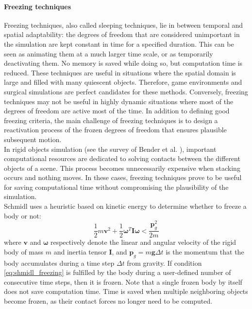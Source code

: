 \paragraph*{Freezing techniques}
Freezing techniques, also called sleeping techniques, lie in between temporal and spatial adaptability: the degrees of freedom that are considered unimportant in the simulation are kept constant in time for a specified duration.
This can be seen as animating them at a much larger time scale, or as temporarily deactivating them.
No memory is saved while doing so, but computation time is reduced.
These techniques are useful in situations where the spatial domain is large and filled with many quiescent objects.
Therefore, game environments and surgical simulations are perfect candidates for these methods.
Conversely, freezing techniques may not be useful in highly dynamic situations where most of the degrees of freedom are active most of the time.
In addition to defining good freezing criteria, the main challenge of freezing techniques is to design a reactivation process of the frozen degrees of freedom that ensures plausible subsequent motion.
\\
In rigid objects simulation (see the survey of Bender et al. \cite{Bender2012:rigid}), important computational resources are dedicated to solving contacts between the different objects of a scene.
This process becomes unnecessarily expensive when stacking occurs and nothing moves.
In these cases, freezing techniques prove to be useful for saving computational time without compromising the plausibility of the simulation.
\\
Schmidl \cite{Schmidl2002} uses a heuristic based on kinetic energy to determine whether to freeze a body or not:
\begin{equation}
\label{eq:shmidl_freezing}
\frac{1}{2}m\mathbf{v}^{2} + \frac{1}{2}\mathbf{\omega}^{T}\mathbf{I}\mathbf{\omega} < \frac{\mathbf{p}_{g}^{2}}{2m}
\end{equation}
where $\mathbf{v}$ and $\mathbf{\omega}$ respectively denote the linear and angular velocity of the rigid body of mass $m$ and inertia tensor $\mathbf{I}$, and $\mathbf{p}_{g}=m\mathbf{g}\Delta t$ is the momentum that the body accumulates during a time step $\Delta t$ from gravity.
If condition \eqref{eq:shmidl_freezing} is fulfilled by the body during a user-defined number of consecutive time steps, then it is frozen.
Note that a single frozen body by itself does not save computation time.
Time is saved when multiple neighboring objects become frozen, as their contact forces no longer need to be computed.

